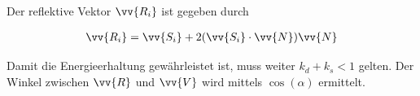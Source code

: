 Der reflektive Vektor $\vv{R_{i}}$ ist gegeben durch

\begin{gather}
    \vv{R_{i}} = \vv{S_{i}} + 2(\vv{S_{i}} \cdot \vv{N})\vv{N}
\end{gather}

Damit die Energieerhaltung gewährleistet ist, muss weiter $k_{d} + k_{s}
< 1$ gelten. Der Winkel zwischen $\vv{R}$ und $\vv{V}$ wird mittels
$\cos(\alpha)$ ermittelt.
